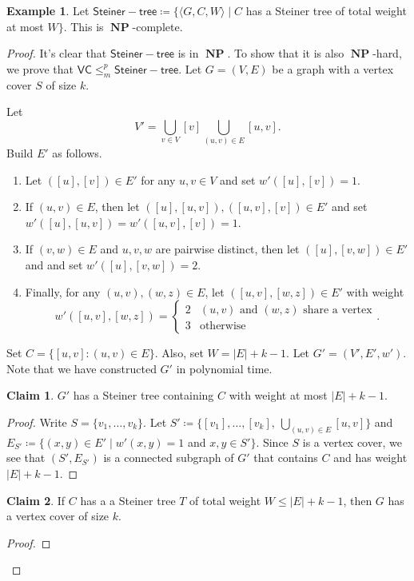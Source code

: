 \documentclass[10pt,letterpaper,cm]{nupset}
\theoremstyle{definition}
\newtheorem{exmp}[definition]{Example}
\theoremstyle{theorem}
\newtheorem*{claim}{Claim}
\theoremstyle{remark}
\newcommand{\1}{\mathbf{1}}
\newcommand{\0}{\vec 0}
\DeclareMathOperator{\NP}{\mathbf{NP}}
\begin{document}
\begin{exmp}
Let $\mathsf{Steiner{-}tree} \coloneqq \{\langle G, C, W \rangle \mid C$ has a Steiner tree of total weight at most $W\}$. This is $\NP$-complete.
\end{exmp}
\begin{proof}
It's clear that $\mathsf{Steiner{-}tree} $ is in $\NP$. To show that it is also $\NP$-hard, we prove that $\mathsf{VC} \leq_m^p \mathsf{Steiner{-}tree} $. Let $G = (V, E)$ be a graph with a vertex cover $S$ of size $k$. 

\medskip

 Let $$V' = \bigcup_{v \in V} [v] \bigcup_{(u,v) \in E}[u,v].$$ Build $E'$ as follows. 
\begin{enumerate}[label=(\alph*)]
\item Let $([u], [v])\in E'$ for any $u,v \in V$ and set $w'([u], [v])=1$. 
\item If $(u,v) \in E$, then let $([u], [u,v]), ([u, v], [v]) \in E'$ and set $w'([u], [u,v]) = w'([u,v], [v]) =1$. 
\item If $(v,w) \in E$ and $u,v,w$ are pairwise distinct, then let $([u], [v,w]) \in E'$ and and set $w'([u], [v,w]) = 2$.
\item Finally, for any $(u,v), (w,z) \in E$, let $([u,v], [w,z])\in E'$  with weight $$w'([u,v], [w,z]) = \begin{cases} 2 & (u,v) \text{ and } (w,z) \text{ share a vertex} \\ 3 & \text{otherwise} \end{cases}.$$ 
\end{enumerate}
Set $C = \{ [u,v] : (u,v) \in E\}$. Also, set $W= |E|+ k -1$. Let $G' = (V', E', w')$. Note that we have constructed $G'$ in polynomial time.
\begin{claim}
$G'$ has a Steiner tree containing $C$ with weight at most $|E| + k -1$.
\end{claim}
\begin{proof}
Write $S = \{v_1, \ldots, v_k\}$. Let $S' \coloneqq \{[v_1], \ldots, [v_k], \ \bigcup_{(u,v) \in E}[u,v]\}$ and $E_{S'} \coloneqq \{ (x,y)\in E' \mid w'(x,y)=1$ and $x,y\in S'\}$. Since $S$ is a vertex cover, we see that $(S', E_{S'})$ is a connected subgraph of $G'$ that contains $C$ and has weight $|E|+k -1$.
\end{proof}
\begin{claim}
If $C$ has a a Steiner tree $T$ of total weight $W \leq |E| +k -1$, then $G$ has a vertex cover of size $k$. 
\end{claim}
\begin{proof}

\end{proof}
\end{proof}
\end{document}
